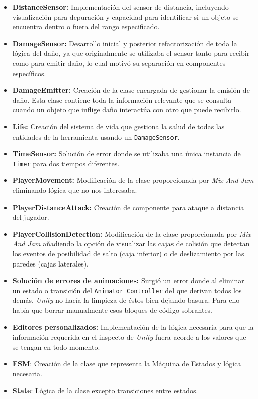 \begin{itemize}
	\item \textbf{DistanceSensor:} Implementación del sensor de distancia, incluyendo visualización para depuración y capacidad para identificar si un objeto se encuentra dentro o fuera del rango especificado.
	\item \textbf{DamageSensor:} Desarrollo inicial y posterior refactorización de toda la lógica del daño, ya que originalmente se utilizaba el sensor tanto para recibir como para emitir daño, lo cual motivó su separación en componentes específicos.
	\item \textbf{DamageEmitter:} Creación de la clase encargada de gestionar la emisión de daño. Esta clase contiene toda la información relevante que se consulta cuando un objeto que inflige daño interactúa con otro que puede recibirlo.
	\item \textbf{Life:} Creación del sistema de vida que gestiona la salud de todas las entidades de la herramienta usando un \texttt{DamageSensor}.
	\item \textbf{TimeSensor:} Solución de error donde se utilizaba una única instancia de \texttt{Timer} para dos tiempos diferentes.
	\item \textbf{PlayerMovement:} Modificación de la clase proporcionada por \textit{Mix And Jam} eliminando lógica que no nos interesaba.
	\item \textbf{PlayerDistanceAttack:} Creación de componente para ataque a distancia del jugador.
	\item \textbf{PlayerCollisionDetection:} Modificación de la clase proporcionada por \textit{Mix And Jam} añadiendo la opción de visualizar las cajas de colisión que detectan los eventos de posibilidad de salto (caja inferior) o de deslizamiento por las paredes (cajas laterales).
	\item \textbf{Solución de errores de animaciones:} Surgió un error donde al eliminar un estado o transición del \texttt{Animator Controller} del que derivan todos los demás, \textit{Unity} no hacía la limpieza de éstos bien dejando basura. Para ello había que borrar manualmente esos bloques de código sobrantes.
	\item \textbf{Editores personalizados:} Implementación de la lógica necesaria para que la información requerida en el inspecto de \textit{Unity} fuera acorde a los valores que se tengan en todo momento.
	\item \textbf{FSM}: Creación de la clase que representa la Máquina de Estados y lógica necesaria.
	\item \textbf{State}: Lógica de la clase excepto transiciones entre estados.

\end{itemize}
